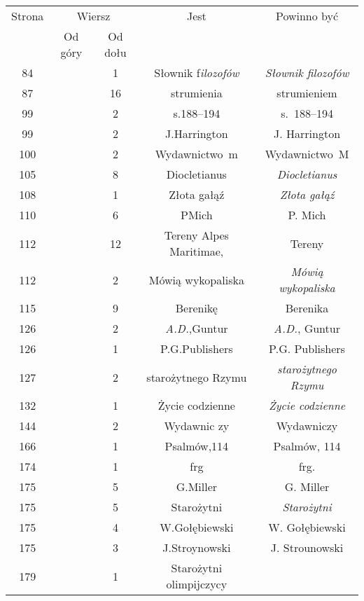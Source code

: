 \documentclass[a4paper,11pt]{article}
\numberwithin{equation}{section}
\begin{document}
\begin{center}
  \begin{tabular}{|c|c|c|c|c|}
    \hline
    Strona & \multicolumn{2}{c|}{Wiersz} & Jest
                              & Powinno być \\ \cline{2-3}
    & Od góry & Od dołu & & \\
    \hline
    84 & & \hphantom{0}1 & Słownik f\textit{ilozofów}
    & \textit{Słownik filozofów} \\
    \hphantom{0}87 & & 16 & strumienia & strumieniem \\
    \hphantom{0}99 & & \hphantom{0}2 & s.188--194 & s.~188--194 \\
    \hphantom{0}99 & & \hphantom{0}2 & J.Harrington & J. Harrington \\
    100 & & \hphantom{0}2 & Wydawnictwo~m & Wydawnictwo~M \\
    105 & & \hphantom{0}8 & Diocletianus & \textit{Diocletianus} \\
    108 & & \hphantom{0}1 & Złota gałąź & \textit{Złota gałąź} \\
    110 & & \hphantom{0}6 & PMich & P. Mich \\
    112 & & 12 & Tereny Alpes Maritimae, & Tereny \\
    112 & & \hphantom{0}2 & Mówią wykopaliska
    & \textit{Mówią wykopaliska} \\
    115 & & \hphantom{0}9 & Berenikę & Berenika \\
    126 & & \hphantom{0}2 & \textit{A.D.},Guntur & \textit{A.D.}, Guntur \\
    126 & & \hphantom{0}1 & P.G.Publishers & P.G. Publishers \\
    127 & & \hphantom{0}2 & starożytnego Rzymu
    & \textit{starożytnego Rzymu} \\
    132 & & \hphantom{0}1 & Życie codzienne & \textit{Życie codzienne} \\
    144 & & \hphantom{0}2 & Wydawnic zy & Wydawniczy \\
    166 & & \hphantom{0}1 & Psalmów,114 & Psalmów, 114 \\
    174 & & \hphantom{0}1 & frg & frg. \\
    175 & & \hphantom{0}5 & G.Miller & G. Miller \\
    175 & & \hphantom{0}5 & Starożytni & \textit{Starożytni} \\
    175 & & \hphantom{0}4 & W.Gołębiewski & W. Gołębiewski \\
    175 & & \hphantom{0}3 & J.Stroynowski & J. Strounowski \\
    179 & & \hphantom{0}1 & Starożytni olimpijczycy

\end{tabular}
\end{center}
\end{document}
